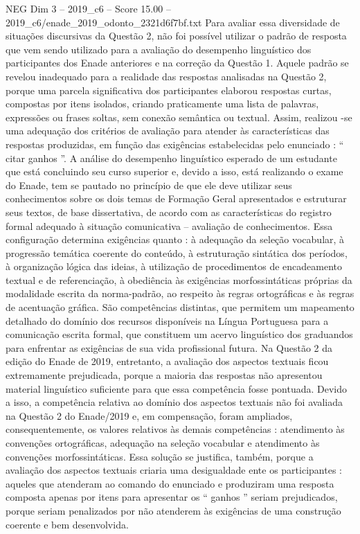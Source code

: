\begin{textsample}{NEG Dim 3 – 2019\_c6 – Score 15.00 – 2019\_c6/enade\_2019\_odonto\_2321d6f7bf.txt}
Para avaliar essa diversidade de situações discursivas da Questão 2, não foi possível utilizar o padrão de resposta que vem sendo utilizado para a avaliação do desempenho linguístico dos participantes dos Enade anteriores e na correção da Questão 1.
Aquele padrão se revelou inadequado para a realidade das respostas analisadas na Questão 2, porque uma parcela significativa dos participantes elaborou respostas curtas, compostas por itens isolados, criando praticamente uma lista de palavras, expressões ou frases soltas, sem conexão semântica ou textual.
Assim, realizou -se uma adequação dos critérios de avaliação para atender às características das respostas produzidas, em função das exigências estabelecidas pelo enunciado : “ citar ganhos ”.
A análise do desempenho linguístico esperado de um estudante que está concluindo seu curso superior e, devido a isso, está realizando o exame do Enade, tem se pautado no princípio de que ele deve utilizar seus conhecimentos sobre os dois temas de Formação Geral apresentados e estruturar seus textos, de base dissertativa, de acordo com as características do registro formal adequado à situação comunicativa – avaliação de conhecimentos.
Essa configuração determina exigências quanto : à adequação da seleção vocabular, à progressão temática coerente do conteúdo, à estruturação sintática dos períodos, à organização lógica das ideias, à utilização de procedimentos de encadeamento textual e de referenciação, à obediência às exigências morfossintáticas próprias da modalidade escrita da norma-padrão, ao respeito às regras ortográficas e às regras de acentuação gráfica.
São competências distintas, que permitem um mapeamento detalhado do domínio dos recursos disponíveis na Língua Portuguesa para a comunicação escrita formal, que constituem um acervo linguístico dos graduandos para enfrentar as exigências de sua vida profissional futura.
Na Questão 2 da edição do Enade de 2019, entretanto, a avaliação dos aspectos textuais ficou extremamente prejudicada, porque a maioria das respostas não apresentou material linguístico suficiente para que essa competência fosse pontuada.
Devido a isso, a competência relativa ao domínio dos aspectos textuais não foi avaliada na Questão 2 do Enade/2019 e, em compensação, foram ampliados, consequentemente, os valores relativos às demais competências : atendimento às convenções ortográficas, adequação na seleção vocabular e atendimento às convenções morfossintáticas.
Essa solução se justifica, também, porque a avaliação dos aspectos textuais criaria uma desigualdade ente os participantes : aqueles que atenderam ao comando do enunciado e produziram uma resposta composta apenas por itens para apresentar os “ ganhos ” seriam prejudicados, porque seriam penalizados por não atenderem às exigências de uma construção coerente e bem desenvolvida.

\end{textsample}
